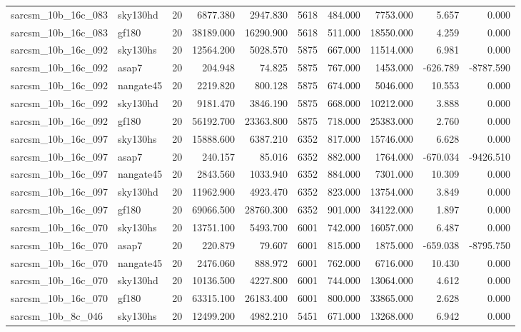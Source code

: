 \begin{longtable}{llrrrrrrrr}
sarcsm\_10b\_16c\_083 & sky130hd & 20 & 6877.380 & 2947.830 & 5618 & 484.000 & 7753.000 & 5.657 & 0.000 \\
sarcsm\_10b\_16c\_083 & gf180 & 20 & 38189.000 & 16290.900 & 5618 & 511.000 & 18550.000 & 4.259 & 0.000 \\
sarcsm\_10b\_16c\_092 & sky130hs & 20 & 12564.200 & 5028.570 & 5875 & 667.000 & 11514.000 & 6.981 & 0.000 \\
sarcsm\_10b\_16c\_092 & asap7 & 20 & 204.948 & 74.825 & 5875 & 767.000 & 1453.000 & -626.789 & -8787.590 \\
sarcsm\_10b\_16c\_092 & nangate45 & 20 & 2219.820 & 800.128 & 5875 & 674.000 & 5046.000 & 10.553 & 0.000 \\
sarcsm\_10b\_16c\_092 & sky130hd & 20 & 9181.470 & 3846.190 & 5875 & 668.000 & 10212.000 & 3.888 & 0.000 \\
sarcsm\_10b\_16c\_092 & gf180 & 20 & 56192.700 & 23363.800 & 5875 & 718.000 & 25383.000 & 2.760 & 0.000 \\
sarcsm\_10b\_16c\_097 & sky130hs & 20 & 15888.600 & 6387.210 & 6352 & 817.000 & 15746.000 & 6.628 & 0.000 \\
sarcsm\_10b\_16c\_097 & asap7 & 20 & 240.157 & 85.016 & 6352 & 882.000 & 1764.000 & -670.034 & -9426.510 \\
sarcsm\_10b\_16c\_097 & nangate45 & 20 & 2843.560 & 1033.940 & 6352 & 884.000 & 7301.000 & 10.309 & 0.000 \\
sarcsm\_10b\_16c\_097 & sky130hd & 20 & 11962.900 & 4923.470 & 6352 & 823.000 & 13754.000 & 3.849 & 0.000 \\
sarcsm\_10b\_16c\_097 & gf180 & 20 & 69066.500 & 28760.300 & 6352 & 901.000 & 34122.000 & 1.897 & 0.000 \\
sarcsm\_10b\_16c\_070 & sky130hs & 20 & 13751.100 & 5493.700 & 6001 & 742.000 & 16057.000 & 6.487 & 0.000 \\
sarcsm\_10b\_16c\_070 & asap7 & 20 & 220.879 & 79.607 & 6001 & 815.000 & 1875.000 & -659.038 & -8795.750 \\
sarcsm\_10b\_16c\_070 & nangate45 & 20 & 2476.060 & 888.972 & 6001 & 762.000 & 6716.000 & 10.430 & 0.000 \\
sarcsm\_10b\_16c\_070 & sky130hd & 20 & 10136.500 & 4227.800 & 6001 & 744.000 & 13064.000 & 4.612 & 0.000 \\
sarcsm\_10b\_16c\_070 & gf180 & 20 & 63315.100 & 26183.400 & 6001 & 800.000 & 33865.000 & 2.628 & 0.000 \\
sarcsm\_10b\_8c\_046 & sky130hs & 20 & 12499.200 & 4982.210 & 5451 & 671.000 & 13268.000 & 6.942 & 0.000 \\

\end{longtable}
